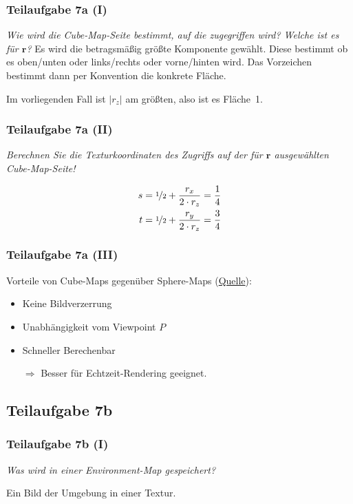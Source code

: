 \documentclass[a4paper]{scrartcl}
\begin{document}
\subsubsection*{Teilaufgabe 7a (I)}
\textit{Wie wird die Cube-Map-Seite bestimmt, auf die zugegriffen wird? Welche ist es für $\mathbf{r}$?}
Es wird die betragsmäßig größte Komponente gewählt. Diese bestimmt ob es
oben/unten oder links/rechts oder vorne/hinten wird. Das Vorzeichen bestimmt
dann per Konvention die konkrete Fläche.

Im vorliegenden Fall ist $|r_z|$ am größten, also ist es Fläche~1.

\subsubsection*{Teilaufgabe 7a (II)}
\textit{Berechnen Sie die Texturkoordinaten des Zugriffs auf der für $\mathbf{r}$ ausgewählten Cube-Map-Seite!}

\begin{align}
    s &= \nicefrac{1}{2} + \frac{r_x}{2 \cdot r_z} = \frac{1}{4}\\
    t &= \nicefrac{1}{2} + \frac{r_y}{2 \cdot r_z} = \frac{3}{4}
\end{align}

\subsubsection*{Teilaufgabe 7a (III)}
Vorteile von Cube-Maps gegenüber Sphere-Maps (\href{https://en.wikipedia.org/wiki/Cube_mapping}{Quelle}):
\begin{itemize}
    \item Keine Bildverzerrung
    \item Unabhängigkeit vom Viewpoint $P$
    \item Schneller Berechenbar
    \item[$\Rightarrow$] Besser für Echtzeit-Rendering geeignet.
\end{itemize}


\subsection*{Teilaufgabe 7b}
\subsubsection*{Teilaufgabe 7b (I)}
\textit{Was wird in einer Environment-Map gespeichert?}

Ein Bild der Umgebung in einer Textur.
\end{document}
